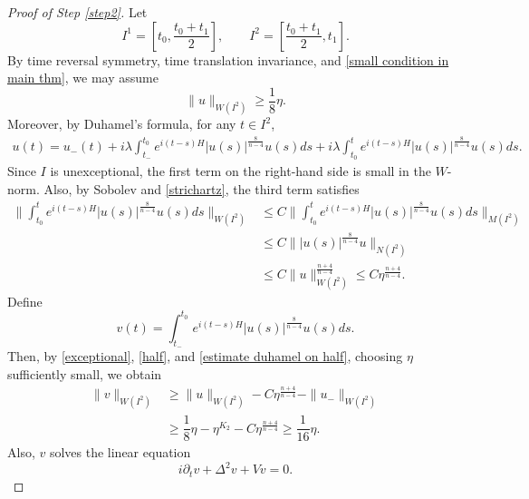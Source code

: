\documentclass[11pt,a4paper]{article}
\numberwithin{equation}{section}
\begin{document}
\begin{proof}[Proof of Step \ref{step2}]
Let
\[
I^{1} = \left[t_{0}, \frac{t_{0} + t_{1}}{2}\right],\qquad
I^{2} = \left[\frac{t_{0} + t_{1}}{2}, t_{1}\right].
\]
By time reversal symmetry, time translation invariance, and \eqref{small condition in main thm}, we may assume
\begin{equation}\label{half}
\|u\|_{W(I^{2})} \geq \dfrac{1}{8}\eta.
\end{equation}
Moreover, by Duhamel's formula, for any $t \in I^{2}$,
\begin{equation}\label{divided duhamel}
\begin{aligned}
u(t) = u_{-}(t) + i\lambda \int_{t_{-}}^{t_{0}} e^{i(t-s)H}|u(s)|^{\frac{8}{n-4}}u(s)ds 
+ i\lambda \int_{t_{0}}^{t} e^{i(t-s)H}|u(s)|^{\frac{8}{n-4}}u(s)ds.
\end{aligned}
\end{equation}
Since $I$ is unexceptional, the first term on the right-hand side is small in the $W$-norm.
Also, by Sobolev and \eqref{strichartz}, the third term satisfies
\begin{equation}\label{estimate duhamel on half}
\begin{aligned}
\|\int_{t_{0}}^{t} e^{i(t-s)H}|u(s)|^{\frac{8}{n-4}}u(s)ds\|_{W(I^{2})}
&\leq C\|\int_{t_{0}}^{t} e^{i(t-s)H}|u(s)|^{\frac{8}{n-4}}u(s)ds\|_{M(I^{2})} \\
&\leq C\||u(s)|^{\frac{8}{n-4}}u\|_{N(I^{2})} \\
&\leq C\|u\|_{W(I^{2})}^{\frac{n+4}{n-4}} \leq C\eta^{\frac{n+4}{n-4}}.
\end{aligned}
\end{equation}
Define
\begin{equation}
v(t) = \int_{t_{-}}^{t_{0}}e^{i(t-s)H}|u(s)|^{\frac{8}{n-4}}u(s)ds.
\end{equation}
Then, by \eqref{exceptional}, \eqref{half}, and \eqref{estimate duhamel on half}, choosing $\eta$ sufficiently small, we obtain
\begin{equation}\label{es:9-step2-2}
\begin{aligned}
\|v\|_{W(I^{2})}
&\geq \|u\|_{W(I^{2})} - C\eta^{\frac{n+4}{n-4}} - \|u_{-}\|_{W(I^{2})} \\
&\geq \dfrac{1}{8}\eta - \eta^{K_{2}} - C\eta^{\frac{n+4}{n-4}} \geq \dfrac{1}{16}\eta.
\end{aligned}
\end{equation}
Also, $v$ solves the linear equation
\begin{equation}\label{linear equation}
i\partial_{t}v + \Delta^{2}v + Vv = 0.

\end{equation}
\end{proof}
\end{document}
